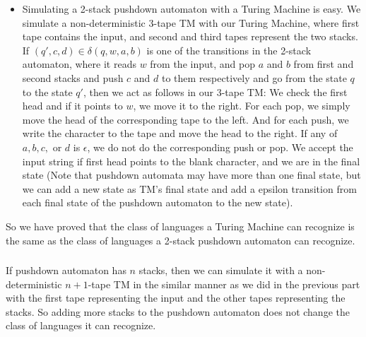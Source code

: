 \documentclass{article}
\begin{document}
\begin{itemize}
\item Simulating a 2-stack pushdown automaton with a Turing Machine is easy.
We simulate a non-deterministic 3-tape TM with our Turing Machine, where first tape contains the input, and second and third tapes represent the two stacks.
If \((q', c, d) \in \delta(q, w, a, b)\) is one of the transitions in the 2-stack automaton, where it reads \(w\) from the input, and pop \(a\) and \(b\) from first and second stacks and push \(c\) and \(d\) to them respectively and go from the state \(q\) to the state \(q'\), then we act as follows in our 3-tape TM:
We check the first head and if it points to \(w\), we move it to the right.
For each pop, we simply move the head of the corresponding tape to the left.
And for each push, we write the character to the tape and move the head to the right.
If any of \(a, b, c,\) or \(d\) is \(\epsilon\), we do not do the corresponding push or pop.
We accept the input string if first head points to the blank character, and we are in the final state
(Note that pushdown automata may have more than one final state, but we can add a new state as TM's final state and add a epsilon transition from each final state of the pushdown automaton to the new state).
\end{itemize}

So we have proved that the class of languages a Turing Machine can recognize is the same as the class of languages a 2-stack pushdown automaton can recognize.

\subsubsection{}
If pushdown automaton has \(n\) stacks, then we can simulate it with a non-deterministic \(n+1\)-tape TM in the similar manner as we did in the previous part with the first tape representing the input and the other tapes representing the stacks.
So adding more stacks to the pushdown automaton does not change the class of languages it can recognize.
\end{document}
